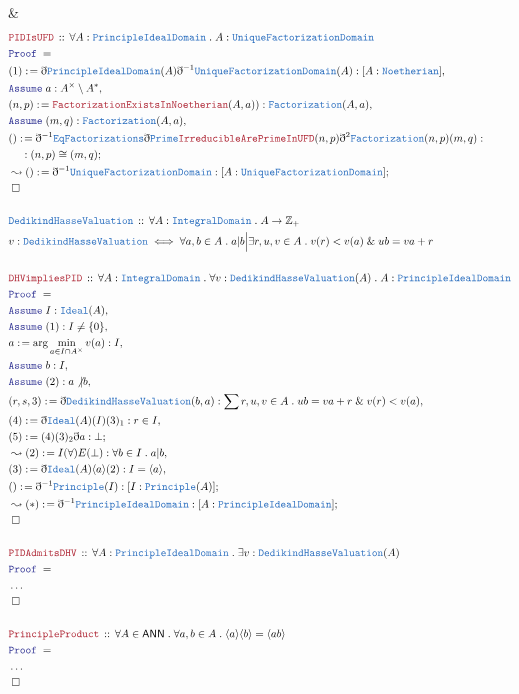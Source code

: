 \documentclass[12pt]{scrartcl}
\newcommand{\TYPE}[1]{\textcolor{NavyBlue}{\mathtt{#1}}}
\newcommand{\LOGIC}[1]{\textcolor{Blue}{\mathtt{#1}}}
\newcommand{\THM}[1]{\textcolor{Maroon}{\mathtt{#1}}}
\renewcommand{\.}{\; . \;}
\newcommand{\de}{: \kern 0.1pc =}
\newcommand{\Theorem}[2]{& \THM{#1} \, :: \, #2 \\ & \Proof = \\ }
\newcommand{\DeclareType}[2]{& \TYPE{#1} \, :: \, #2 \\}
\newcommand{\DefineType}[3]{& #1 : \TYPE{#2} \iff #3 \\}
\newcommand{\NewLine}{\\ & \kern 1pc}
\newcommand{\Page}[1]{ \begin{align*} #1 \end{align*}   }
\newcommand{ \bd }{ \ByDef }
\newcommand{\NoProof}{ & \ldots \\ \EndProof}
\renewcommand{\And}{\; \& \;}
\newcommand{\Int}{\mathbb{Z} }
\newcommand{\Say}[3]{& #1 \de #2 : #3, \\}
\newcommand{\Conclude}[3]{& #1 \de #2 : #3; \\}
\newcommand{\Derive}[3]{& \leadsto #1 \de #2 : #3, \\}
\newcommand{\DeriveConclude}[3]{& \leadsto #1 \de #2 : #3 ; \\}
\newcommand{\Assume}[2]{& \LOGIC{Assume} \; #1 : #2, \\}
\newcommand{\QED}{\; \square}
\newcommand{\EndProof}{& \QED \\}
\newcommand{\ByDef}{\eth}
\newcommand{\Proof}{\LOGIC{Proof} \; }
\newcommand{\Ideal}{\TYPE{Ideal}}
\newcommand{\ID}{\TYPE{IntegralDomain}}
\newcommand{\UFD}{\TYPE{UniqueFactorizationDomain}}
\newcommand{\PID}{\TYPE{PrincipleIdealDomain}}
\newcommand{\ANN}{\mathsf{ANN}}
\begin{document}
{	\EndProof
}\Page{
	\Theorem{PIDIsUFD}{ \forall A : \PID \.  A : \UFD }
	\Say{(1)}{\bd \PID(A) \bd^{-1} \UFD(A)}{[A : \TYPE{Noetherian}]}
	\Assume{a}{A^\times \setminus A^*}
	\Say{(n,p)}{\THM{FactorizationExistsInNoetherian}(A,a))}{ \TYPE{Factorization}(A,a)}
	\Assume{(m,q)}{\TYPE{Factorization}(A,a)}
	\Conclude{()}{\bd^{-1}\TYPE{EqFactorizations}\bd \TYPE{Prime}\THM{IrreducibleArePrimeInUFD}(n,p)\bd^2 \TYPE{Factorization}(n,p)(m,q)}{ 
		\NewLine : (n,p) \cong (m,q) }
	\DeriveConclude{()}{\bd^{-1} \UFD  }{ [A : \UFD] }
	\EndProof
	\\
	\DeclareType{DedikindHasseValuation}{\forall A : \ID \. A  \to \Int_+ }
	\DefineType{v}{DedikindHasseValuation}{\forall a,b \in A \. a | b  \Big | \exists r,u,v \in A \. v(r) < v(a) \And ub = va + r} 
	\\
	\Theorem{DHVimpliesPID}{\forall A : \ID \.  \forall v : \TYPE{DedikindHasseValuation}(A) \. A : \PID}
	\Assume{I}{\Ideal(A)}
	\Assume{(1)}{I \neq \{ 0 \}}
	\Say{a}{\arg \min_{a \in I \cap A^\times} v(a)}{I}
	\Assume{b}{I}
	\Assume{(2)}{ a \not | b}
	\Say{(r,s,3)}{ \bd \TYPE{DedikindHasseValuation}(b,a)  }{ \sum r,u,v \in A \. ub = va + r \And v(r) < v(a)  }
	\Say{(4)}{\bd \Ideal(A)(I)(3)_1}{ r \in I}
	\Conclude{(5)}{ (4)(3)_2\bd a }{  \bot   }
	\Derive{(2)}{I(\forall)E(\bot)}{ \forall b \in I \.  a | b}
	\Say{(3)}{\bd \Ideal(A)\langle a \rangle(2)}{ I = \langle a \rangle}
	\Conclude{()}{\bd^{-1} \TYPE{Principle}(I) }{ [I : \TYPE{Principle}(A)]}
	\DeriveConclude{(*)}{\bd^{-1}\PID}{[A : \PID]}
	\EndProof
	\\
	\Theorem{PIDAdmitsDHV}{\forall A : \PID \. \exists v : \TYPE{DedikindHasseValuation}(A)}
	\NoProof
	\\
	\Theorem{PrincipleProduct}{\forall A \in \ANN \. \forall a,b \in A \.  \langle a \rangle \langle b \rangle = \langle ab \rangle}
	\NoProof
}
\newpage
\end{document}
